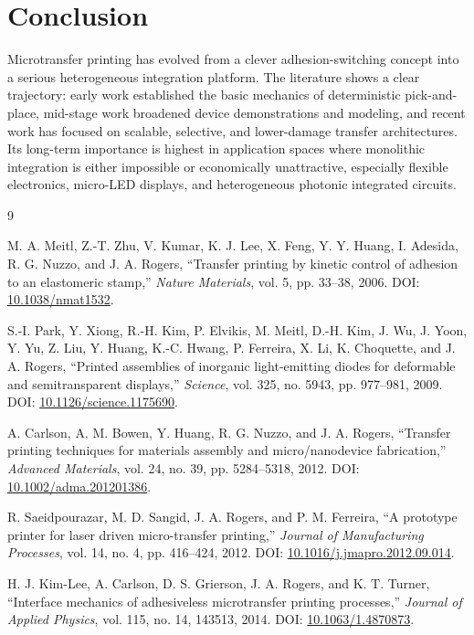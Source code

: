 \documentclass[11pt,a4paper]{article}
\begin{document}
\section{Conclusion}
Microtransfer printing has evolved from a clever adhesion-switching concept into a serious heterogeneous integration platform. The literature shows a clear trajectory: early work established the basic mechanics of deterministic pick-and-place, mid-stage work broadened device demonstrations and modeling, and recent work has focused on scalable, selective, and lower-damage transfer architectures. Its long-term importance is highest in application spaces where monolithic integration is either impossible or economically unattractive, especially flexible electronics, micro-LED displays, and heterogeneous photonic integrated circuits.

\begin{thebibliography}{9}

M. A. Meitl, Z.-T. Zhu, V. Kumar, K. J. Lee, X. Feng, Y. Y. Huang, I. Adesida, R. G. Nuzzo, and J. A. Rogers,
``Transfer printing by kinetic control of adhesion to an elastomeric stamp,''
\textit{Nature Materials}, vol. 5, pp. 33--38, 2006.
DOI: \href{https://doi.org/10.1038/nmat1532}{10.1038/nmat1532}.

S.-I. Park, Y. Xiong, R.-H. Kim, P. Elvikis, M. Meitl, D.-H. Kim, J. Wu, J. Yoon, Y. Yu, Z. Liu, Y. Huang, K.-C. Hwang, P. Ferreira, X. Li, K. Choquette, and J. A. Rogers,
``Printed assemblies of inorganic light-emitting diodes for deformable and semitransparent displays,''
\textit{Science}, vol. 325, no. 5943, pp. 977--981, 2009.
DOI: \href{https://doi.org/10.1126/science.1175690}{10.1126/science.1175690}.

A. Carlson, A. M. Bowen, Y. Huang, R. G. Nuzzo, and J. A. Rogers,
``Transfer printing techniques for materials assembly and micro/nanodevice fabrication,''
\textit{Advanced Materials}, vol. 24, no. 39, pp. 5284--5318, 2012.
DOI: \href{https://doi.org/10.1002/adma.201201386}{10.1002/adma.201201386}.

R. Saeidpourazar, M. D. Sangid, J. A. Rogers, and P. M. Ferreira,
``A prototype printer for laser driven micro-transfer printing,''
\textit{Journal of Manufacturing Processes}, vol. 14, no. 4, pp. 416--424, 2012.
DOI: \href{https://doi.org/10.1016/j.jmapro.2012.09.014}{10.1016/j.jmapro.2012.09.014}.

H. J. Kim-Lee, A. Carlson, D. S. Grierson, J. A. Rogers, and K. T. Turner,
``Interface mechanics of adhesiveless microtransfer printing processes,''
\textit{Journal of Applied Physics}, vol. 115, no. 14, 143513, 2014.
DOI: \href{https://doi.org/10.1063/1.4870873}{10.1063/1.4870873}.


\end{thebibliography}
\end{document}

